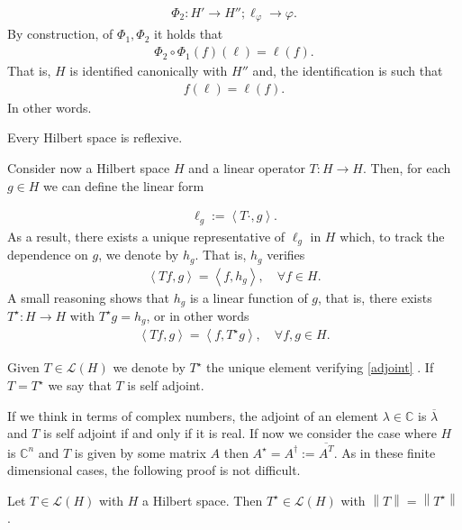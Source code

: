 \documentclass[
    a4paper,
    DIV=14,
    abstract=true,
    numbers=noenddot
]{scrartcl}
\begin{document}
	\begin{align*}
		\Phi_2:  H'\to H''; \ell_\varphi \to \varphi .
	\end{align*}
	By construction, of $\Phi_1,\Phi_2$ it holds that
	\begin{align*}
		\Phi_2 \circ \Phi_1 (f) (\ell )= \ell(f).
	\end{align*}
	That is, $H$ is identified canonically with  $H''$ and, the identification is such that \begin{align*}
		f(\ell )=\ell (f).
	\end{align*}
	In other words.
	\begin{theorem}
		Every Hilbert space is reflexive.
	\end{theorem}
	Consider now a Hilbert space $H$ and a linear operator $T: H \to H$.
	Then, for each $g \in H$ we can define the linear form

	\begin{align}
		\ell_ g := \left\langle T\cdot ,g\right\rangle.
	\end{align}
	As a result, there exists a unique representative of
	$\ell_g$ in $H$ which, to track the dependence on $g$, we denote by
	$h_g$. That is, $h_g$ verifies
	\begin{align}
		\left\langle T f,g\right\rangle= \left\langle f,h_g\right\rangle, \quad\forall f \in H.
	\end{align}
	A small reasoning shows that $h_g$ is a linear
	function of $g$, that is, there exists $T^\star :H \to H$ with $T^\star  g=h_g$,
	or in other words
	\begin{align}\label{adjoint}
		\left\langle Tf,g\right\rangle=\left\langle f, T^\star g\right\rangle , \quad\forall f,g \in  H.
	\end{align}
	\begin{definition}
		Given $T \in \mathcal{L}(H)$ we denote by $T^\star $ the
		unique element  verifying
		\eqref{adjoint} . If
		$T=T^\star $ we say that $T$ is self adjoint.
	\end{definition}
	If we think in terms of complex numbers, the adjoint of an element
	$\lambda  \in \mathbb{C}$ is $\overline{\lambda }$ and $T$ is self
	adjoint if and only if it is real. If now we consider the case where $H$
	is $\mathbb{C}^n$ and $T$ is given by some matrix $A$ then
	$A^\star =A^\dagger:= \overline{A^T}$. As in these finite dimensional cases,
	the following proof is not difficult.
	\begin{proposition} Let $T \in \mathcal{L}(H)$ with $H$ a Hilbert space.
		Then $T^\star  \in \mathcal{L}(H)$ with
		$\left\lVert T \right\rVert=\left\lVert T^\star  \right\rVert$.
	\end{proposition}
\end{document}
